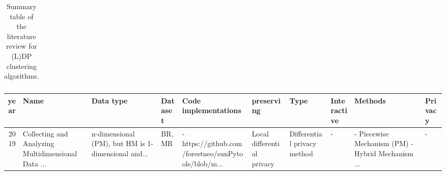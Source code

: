 \begin{landscape}
\begin{table}[ht]
\begin{adjustbox}{width=1.8\textwidth}
\begin{tabular}{rlllllllll}
        \bottomrule
      \end{tabular}
    \end{adjustbox}
    \caption{Summary table of the literature review for (L)DP clustering algorithms.}
  \end{table}


  \begin{table}[ht]
    \centering
    \begin{adjustbox}{width=1.8\textwidth}

      \begin{tabular}{rlllllllll}
        \toprule
        year                   & Name                                               & Data type                                          & Dataset                                            & Code implementations                               & preserving                 & Type                        & Interactive     & Methods                    & Privacy                         \\
        \midrule
        2019                   & Collecting and Analyzing Multidimensional Data ... & n-dimensional (PM), but HM is 1-dimensional and... & BR, MR                                             & -https://github.com/forestneo/sunPytools/blob/m... & Local differential privacy & Differential privacy method & -               & - Piecewise Mechanism (PM)
        - Hybrid Mechanism ... & -                                                                                                                                                                                                                                                                                                                                                             \\

\end{tabular}
\end{adjustbox}
\end{table}
\end{landscape}
